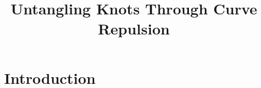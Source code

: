 \documentclass[a4paper]{article}
\title{Untangling Knots Through Curve Repulsion}
\begin{document}
\section{Introduction}

\end{document}
